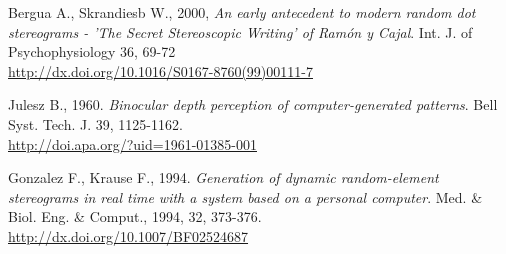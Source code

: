 \begin{thebibliography}{12}
Bergua A., Skrandiesb W., 2000, {\it An early antecedent to modern random dot stereograms - 'The Secret Stereoscopic Writing’ of Ram\'on y Cajal}. Int. J. of Psychophysiology 36, 69-72\\
\url{http://dx.doi.org/10.1016/S0167-8760(99)00111-7}

Julesz B., 1960. {\it Binocular depth perception of computer-generated patterns}. Bell Syst. Tech. J. 39, 1125-1162.\\
\url{http://doi.apa.org/?uid=1961-01385-001}

Gonzalez F., Krause F., 1994. {\it Generation of dynamic random-element stereograms in real time with a system based on a personal computer}. Med. \& Biol. Eng. \& Comput., 1994, 32, 373-376.\\
\url{http://dx.doi.org/10.1007/BF02524687}
\end{thebibliography}
